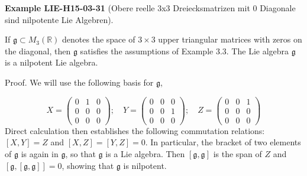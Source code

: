 \documentclass[10pt, letterpaper]{article}
\newcommand{\CustomHeading}[3]{%
  \par\medskip\noindent%
  \textbf{#1 #2} \textnormal{(#3)}.\enskip%
}
\newenvironment{EXA}[2]{\CustomHeading{Example}{#1}{#2}}{}
\begin{document}
\begin{EXA}{LIE-H15-03-31}{Obere reelle 3x3 Dreiecksmatrizen mit 0 Diagonale sind nilpotente Lie Algebren}
If $\mathfrak{g} \subset M_{3}(\mathbb{R})$ denotes the space of $3 \times 3$ upper triangular matrices with zeros on the diagonal, then $\mathfrak{g}$ satisfies the assumptions of Example 3.3. The Lie algebra $\mathfrak{g}$ is a nilpotent Lie algebra.

Proof. We will use the following basis for $\mathfrak{g}$,

$$
X=\left(\begin{array}{ccc}
0 & 1 & 0 \\
0 & 0 & 0 \\
0 & 0 & 0
\end{array}\right) ; \quad Y=\left(\begin{array}{ccc}
0 & 0 & 0 \\
0 & 0 & 1 \\
0 & 0 & 0
\end{array}\right) ; \quad Z=\left(\begin{array}{ccc}
0 & 0 & 1 \\
0 & 0 & 0 \\
0 & 0 & 0
\end{array}\right)
$$
Direct calculation then establishes the following commutation relations: $[X, Y]= Z$ and $[X, Z]=[Y, Z]=0$. In particular, the bracket of two elements of $\mathfrak{g}$ is again in $\mathfrak{g}$, so that $\mathfrak{g}$ is a Lie algebra. Then $[\mathfrak{g}, \mathfrak{g}]$ is the span of $Z$ and $[\mathfrak{g},[\mathfrak{g}, \mathfrak{g}]]=0$, showing that $\mathfrak{g}$ is nilpotent.
\end{EXA}
\end{document}
